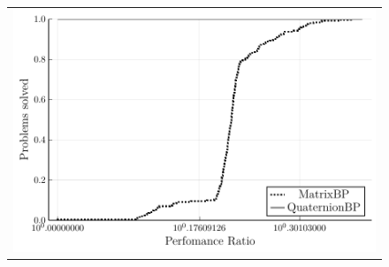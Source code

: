 \documentclass[a4paper,11pt]{article}
\begin{document}
\begin{figure}[H]
\begin{tabular}{cc}
			\multicolumn{2}{c}{\includegraphics[scale=0.55]{figures/perfomance_profile.pdf}}\\
		\end{tabular}
		\label{fig:mean}
	\end{figure}
	
	\newpage
\end{document}
